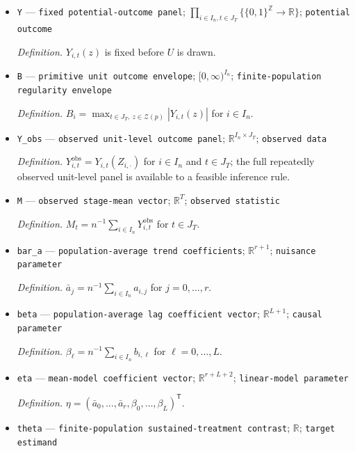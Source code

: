 \documentclass{article}
\begin{document}
\begin{itemize}
  \item \texttt{Y} --- \texttt{fixed potential-\allowbreak{}outcome panel}; \(\prod_{i\in I_n,t\in J_T}\{\{0,1\}^{\mathbb Z}\to\mathbb R\}\); \texttt{potential outcome}
  \par\smallskip\noindent\emph{Definition.} \(Y_{i,t}(z)\) is fixed before \(U\) is drawn.
  \item \texttt{B} --- \texttt{primitive unit outcome envelope}; \([0,\infty)^{I_n}\); \texttt{finite-\allowbreak{}population regularity envelope}
  \par\smallskip\noindent\emph{Definition.} \(B_i=\max_{t\in J_T,\ z\in\mathcal Z(p)}|Y_{i,t}(z)|\) for \(i\in I_n\).
  \item \texttt{Y\_\allowbreak{}obs} --- \texttt{observed unit-\allowbreak{}level outcome panel}; \(\mathbb R^{I_n\times J_T}\); \texttt{observed data}
  \par\smallskip\noindent\emph{Definition.} \(Y^{\mathrm{obs}}_{i,t}=Y_{i,t}(Z_{i,\cdot})\) for \(i\in I_n\) and \(t\in J_T\); the full repeatedly observed unit-level panel is available to a feasible inference rule.
  \item \texttt{M} --- \texttt{observed stage-\allowbreak{}mean vector}; \(\mathbb R^T\); \texttt{observed statistic}
  \par\smallskip\noindent\emph{Definition.} \(M_t=n^{-1}\sum_{i\in I_n}Y^{\mathrm{obs}}_{i,t}\) for \(t\in J_T\).
  \item \texttt{bar\_\allowbreak{}a} --- \texttt{population-\allowbreak{}average trend coefficients}; \(\mathbb R^{r+1}\); \texttt{nuisance parameter}
  \par\smallskip\noindent\emph{Definition.} \(\bar a_j=n^{-1}\sum_{i\in I_n}a_{i,j}\) for \(j=0,\ldots,r\).
  \item \texttt{beta} --- \texttt{population-\allowbreak{}average lag coefficient vector}; \(\mathbb R^{L+1}\); \texttt{causal parameter}
  \par\smallskip\noindent\emph{Definition.} \(\beta_\ell=n^{-1}\sum_{i\in I_n}b_{i,\ell}\) for \(\ell=0,\ldots,L\).
  \item \texttt{eta} --- \texttt{mean-\allowbreak{}model coefficient vector}; \(\mathbb R^{r+L+2}\); \texttt{linear-\allowbreak{}model parameter}
  \par\smallskip\noindent\emph{Definition.} \(\eta=(\bar a_0,\ldots,\bar a_r,\beta_0,\ldots,\beta_L)^{\mathsf T}\).
  \item \texttt{theta} --- \texttt{finite-\allowbreak{}population sustained-\allowbreak{}treatment contrast}; \(\mathbb R\); \texttt{target estimand}

\end{itemize}
\end{document}
